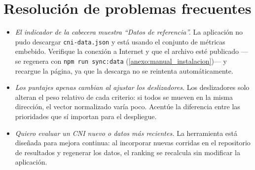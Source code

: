 \section{Resolución de problemas frecuentes}

\begin{itemize}
\item \emph{El indicador de la cabecera muestra ``Datos de referencia''.} La aplicación no pudo descargar \texttt{cni-data.json} y está usando el conjunto de métricas embebido. Verifique la conexión a Internet y que el archivo esté publicado ---se regenera con \texttt{npm run sync:data} (\cref{anexo:manual_instalacion})--- y recargue la página, ya que la descarga no se reintenta automáticamente.
\item \emph{Los puntajes apenas cambian al ajustar los deslizadores.} Los deslizadores solo alteran el peso relativo de cada criterio: si todos se mueven en la misma dirección, el vector normalizado varía poco. Acentúe la diferencia entre las prioridades que sí importan para el despliegue.
\item \emph{Quiero evaluar un CNI nuevo o datos más recientes.} La herramienta está diseñada para mejora continua: al incorporar nuevas corridas en el repositorio de resultados y regenerar los datos, el ranking se recalcula sin modificar la aplicación.
\end{itemize}
